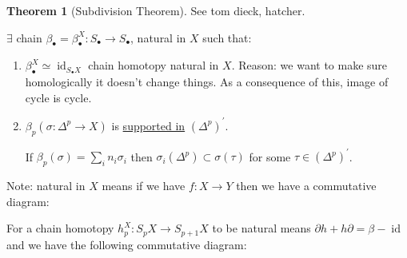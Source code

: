 \documentclass{article}
\theoremstyle{definition}
\newtheorem{theorem}{Theorem}
\begin{document}
    \begin{theorem}
        [Subdivision Theorem] See tom dieck, hatcher.

        \(\exists\) chain \(\beta_\bullet = \beta_\bullet^X : S_\bullet \to S_\bullet\), natural in \(X\) such that:

        \begin{enumerate}[label=\arabic*)]
            \item \(\beta_\bullet ^X \simeq \operatorname{id}_{S_\bullet X}\) chain homotopy natural in \(X\). Reason: we want to make sure homologically it doesn't change things. As a consequence of this, image of cycle is cycle.
            \item \(\beta_p(\sigma: \Delta^p \to X)\) is \underline{supported in} \((\Delta^p)^{\prime}\).
            
            If \(\beta_{p}(\sigma) = \sum_{i} n_i \sigma_i\) then \(\sigma_i(\Delta^p) \subset \sigma(\tau)\) for some \(\tau \in (\Delta^p)^{\prime}\).
        \end{enumerate}
        
        Note: natural in \(X\) means if we have \(f:X \to Y\) then we have a commutative diagram:

        \begin{center}
        \end{center}

        For a chain homotopy \(h_p^X: S_p X \to S_{p+1} X\) to be natural means \(\partial h + h \partial = \beta - \operatorname{id}\) and we have the following commutative diagram:

        \begin{center}
        \end{center}

    \end{theorem}
\end{document}
